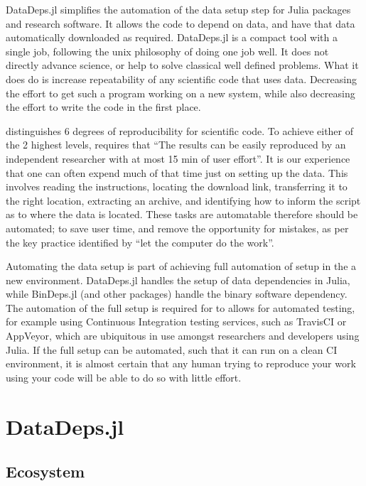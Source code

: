 \documentclass[twoside,11pt]{article}\usepackage{jmlr2e}
\begin{document}
DataDeps.jl simplifies the automation of the data setup step for Julia \citep{Julia}  packages and research software.
It allows the code to depend on data, and have that data automatically downloaded as required.
DataDeps.jl is a compact tool with a single job, following the unix philosophy of doing one job well.
It does not directly advance science, or help to solve classical well defined problems.
What it does do is increase repeatability of any scientific code that uses data.
Decreasing the effort to get such a program working on a new system,
while also decreasing the effort to write the code in the first place.


\citet{VabdewakkeReproduceableResearch} distinguishes 6 degrees of reproducibility for scientific code.
To achieve either of the 2 highest levels,
requires that ``The results can be easily reproduced by an independent researcher with at most 15 min of user effort''.
It is our experience that one can often expend much of that time just on setting up the data.
This involves reading the instructions, locating the download link, transferring it to the right location, extracting an archive, and identifying how to inform the script as to where the data is located.
These tasks are automatable therefore should be automated; to save user time, and remove the opportunity for mistakes, as per the key practice identified by \citet{10.1371/journal.pbio.1001745} ``let the computer do the work''.

Automating the data setup is part of achieving full automation of setup in the a new environment.
DataDeps.jl handles the setup of data dependencies in Julia, while BinDeps.jl (and other packages) handle the binary software dependency.
The automation of the full setup is required for to allows for automated testing, for example using Continuous Integration testing services, such as TravisCI or AppVeyor, which are ubiquitous in use amongst researchers and developers using Julia.
If the full setup can be automated, such that it can run on a clean CI environment,
it is almost certain that any human trying to reproduce your work 
using your code will be able to do so with little effort.




\section{DataDeps.jl}
\subsection{Ecosystem}
\end{document}
